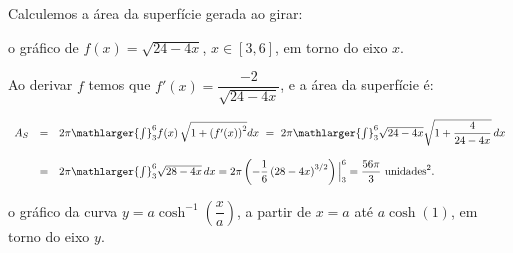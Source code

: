 \cleardoublepage\documentclass[../main.tex]{subfiles}
\begin{document}
\begin{ex}
Calculemos a área da superfície gerada ao girar:
\begin{compactenum}[a)]
\item o gráfico de \(f(x)=\sqrt{24-4x}\), \(x\in[3,6]\), em torno do eixo \(x\).

\begin{solution}
Ao derivar \(f\) temos que \(f'(x)=\dfrac{-2}{\sqrt{24-4x}}\), e a área da superfície é:

\[ \begin{array}{rcl} A_S&=& 2\pi \mathlarger{\int}^{6}_{3} f(x)\,\sqrt{ 1+ \left(f'(x)\right)^2} dx\,\,=\,\, 2\pi \mathlarger{\int}^{6}_{3}\sqrt{24-4x} \sqrt{ 1+ \dfrac{4}{24-4x}}\, dx\\ \\ & =& 2\pi \mathlarger{\int}^{6}_{3} \sqrt{28-4x}\, dx =2\pi\left(-\dfrac{1}{6}\left(28-4x\right)^{3/2}\right)\Big{|}^{6}_{3}=\dfrac{56\pi}{3} \mbox{ unidades}^2. \end{array} \]
\end{solution}
\begin{figure}[H]
\centering
{}\hfill
{}\hfill 
{}
\end{figure}
\item o gráfico da curva \(y=a \cosh^{-1}\left(\dfrac{x}{a}\right)\), a partir de \(x=a\) até \(a\cosh( 1)\), em torno do eixo \(y\).


\end{compactenum}
\end{ex}
\end{document}
